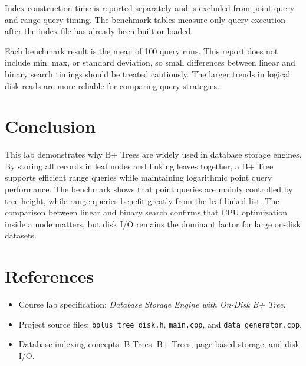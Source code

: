 \documentclass[12pt,a4paper]{article}
\begin{document}
Index construction time is reported separately and is excluded from point-query and range-query timing. The benchmark tables measure only query execution after the index file has already been built or loaded.

Each benchmark result is the mean of 100 query runs. This report does not include min, max, or standard deviation, so small differences between linear and binary search timings should be treated cautiously. The larger trends in logical disk reads are more reliable for comparing query strategies.

\section{Conclusion}

This lab demonstrates why B+ Trees are widely used in database storage engines. By storing all records in leaf nodes and linking leaves together, a B+ Tree supports efficient range queries while maintaining logarithmic point query performance. The benchmark shows that point queries are mainly controlled by tree height, while range queries benefit greatly from the leaf linked list. The comparison between linear and binary search confirms that CPU optimization inside a node matters, but disk I/O remains the dominant factor for large on-disk datasets.

\section{References}

\begin{itemize}
    \item Course lab specification: \textit{Database Storage Engine with On-Disk B+ Tree}.
    \item Project source files: \texttt{bplus\_tree\_disk.h}, \texttt{main.cpp}, and \texttt{data\_generator.cpp}.
    \item Database indexing concepts: B-Trees, B+ Trees, page-based storage, and disk I/O.
\end{itemize}
\end{document}
